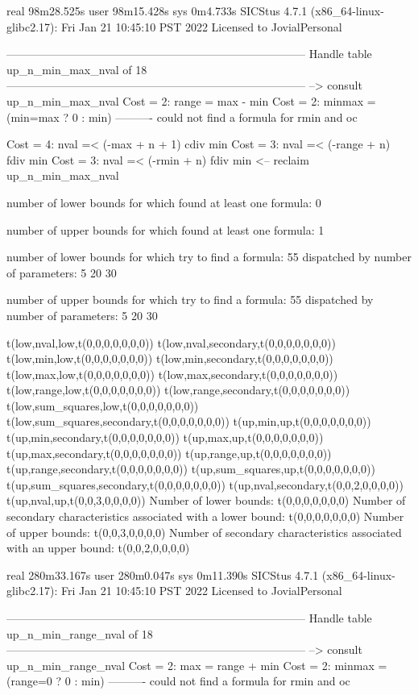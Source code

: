 real	98m28.525s
user	98m15.428s
sys	0m4.733s
SICStus 4.7.1 (x86_64-linux-glibc2.17): Fri Jan 21 10:45:10 PST 2022
Licensed to JovialPersonal


--------------------------------------------------------------------------------
Handle table up_n_min_max_nval of 18
--------------------------------------------------------------------------------
--> consult up_n_min_max_nval
Cost =  2:  range  = max - min
Cost =  2:  minmax = (min=max ? 0 : min)
----------
could not find a formula for rmin and oc

Cost =  4:  nval =< (-max + n + 1) cdiv min %
Cost =  3:  nval =< (-range + n) fdiv min
Cost =  3:  nval =< (-rmin + n) fdiv min %
<-- reclaim up_n_min_max_nval

number of lower bounds for which found at least one formula: 0

number of upper bounds for which found at least one formula: 1

number of lower bounds for which try to find a formula: 55
dispatched by number of parameters: 5  20  30

number of upper bounds for which try to find a formula: 55
dispatched by number of parameters: 5  20  30

t(low,nval,low,t(0,0,0,0,0,0,0))
t(low,nval,secondary,t(0,0,0,0,0,0,0))
t(low,min,low,t(0,0,0,0,0,0,0))
t(low,min,secondary,t(0,0,0,0,0,0,0))
t(low,max,low,t(0,0,0,0,0,0,0))
t(low,max,secondary,t(0,0,0,0,0,0,0))
t(low,range,low,t(0,0,0,0,0,0,0))
t(low,range,secondary,t(0,0,0,0,0,0,0))
t(low,sum_squares,low,t(0,0,0,0,0,0,0))
t(low,sum_squares,secondary,t(0,0,0,0,0,0,0))
t(up,min,up,t(0,0,0,0,0,0,0))
t(up,min,secondary,t(0,0,0,0,0,0,0))
t(up,max,up,t(0,0,0,0,0,0,0))
t(up,max,secondary,t(0,0,0,0,0,0,0))
t(up,range,up,t(0,0,0,0,0,0,0))
t(up,range,secondary,t(0,0,0,0,0,0,0))
t(up,sum_squares,up,t(0,0,0,0,0,0,0))
t(up,sum_squares,secondary,t(0,0,0,0,0,0,0))
t(up,nval,secondary,t(0,0,2,0,0,0,0))
t(up,nval,up,t(0,0,3,0,0,0,0))
Number of lower bounds:                                             t(0,0,0,0,0,0,0)
Number of secondary characteristics associated with a lower bound:  t(0,0,0,0,0,0,0)
Number of upper bounds:                                             t(0,0,3,0,0,0,0)
Number of secondary characteristics associated with an upper bound: t(0,0,2,0,0,0,0)

real	280m33.167s
user	280m0.047s
sys	0m11.390s
SICStus 4.7.1 (x86_64-linux-glibc2.17): Fri Jan 21 10:45:10 PST 2022
Licensed to JovialPersonal


--------------------------------------------------------------------------------
Handle table up_n_min_range_nval of 18
--------------------------------------------------------------------------------
--> consult up_n_min_range_nval
Cost =  2:  max    = range + min
Cost =  2:  minmax = (range=0 ? 0 : min)
----------
could not find a formula for rmin and oc

